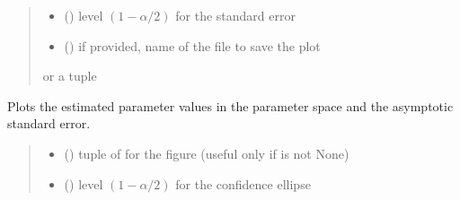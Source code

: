 \documentclass[letterpaper,10pt,english]{sphinxmanual}
\begin{document}
\begin{fulllineitems}
\begin{fulllineitems}
\begin{quote}
\begin{description}
\begin{itemize}
\item {} 
\sphinxAtStartPar
{} () \textendash{} level \((1-\alpha/2)\) for the standard error

\item {} 
\sphinxAtStartPar
{} () \textendash{} if provided, name of the file to save the plot

\end{itemize}

\sphinxAtStartPar
{} or a tuple 

\end{description}\end{quote}

\end{fulllineitems}


\begin{fulllineitems}
\label{\detokenize{cubmods:cubmods.cush.CUBresCUSH.plot_estim}}
\pysigstartsignatures
{}
\pysigstopsignatures
\sphinxAtStartPar
Plots the estimated parameter values in the parameter space and
the asymptotic standard error.
\begin{quote}\begin{description}
\begin{itemize}
\item {} 
\sphinxAtStartPar
{} () \textendash{} tuple of  for the figure (useful only if  is not None)

\item {} 
\sphinxAtStartPar
{} () \textendash{} level \((1-\alpha/2)\) for the confidence ellipse


\end{itemize}
\end{description}
\end{quote}
\end{fulllineitems}
\end{fulllineitems}
\end{document}
